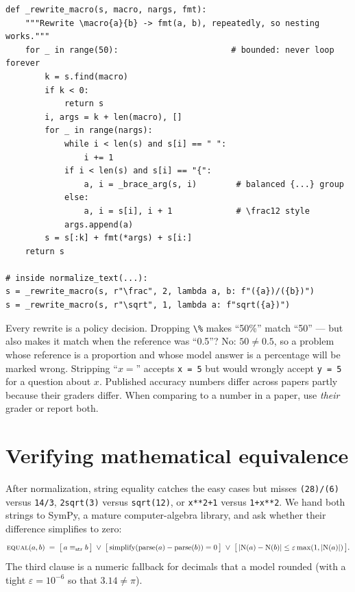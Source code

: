 \begin{lstlisting}[caption={Rewriting macros with brace-delimited arguments (excerpt).},label={lst:eval:rewrite}]
def _rewrite_macro(s, macro, nargs, fmt):
    """Rewrite \macro{a}{b} -> fmt(a, b), repeatedly, so nesting works."""
    for _ in range(50):                       # bounded: never loop forever
        k = s.find(macro)
        if k < 0:
            return s
        i, args = k + len(macro), []
        for _ in range(nargs):
            while i < len(s) and s[i] == " ":
                i += 1
            if i < len(s) and s[i] == "{":
                a, i = _brace_arg(s, i)        # balanced {...} group
            else:
                a, i = s[i], i + 1             # \frac12 style
            args.append(a)
        s = s[:k] + fmt(*args) + s[i:]
    return s

# inside normalize_text(...):
s = _rewrite_macro(s, r"\frac", 2, lambda a, b: f"({a})/({b})")
s = _rewrite_macro(s, r"\sqrt", 1, lambda a: f"sqrt({a})")
\end{lstlisting}

\begin{pitfall}
Every rewrite is a policy decision. Dropping \texttt{\textbackslash\%} makes ``50\%'' match
``50'' --- but also makes it match when the reference was ``0.5''? No: $50 \ne 0.5$, so a
problem whose reference is a proportion and whose model answer is a percentage will be marked
wrong. Stripping ``$x=$'' accepts \texttt{x = 5} but would wrongly accept \texttt{y = 5} for a
question about $x$. Published accuracy numbers differ across papers partly because their graders
differ. When comparing to a number in a paper, use \emph{their} grader or report both.
\end{pitfall}

\section{Verifying mathematical equivalence}\label{sec:eval:sympy}

After normalization, string equality catches the easy cases but misses \texttt{(28)/(6)} versus
\texttt{14/3}, \texttt{2sqrt(3)} versus \texttt{sqrt(12)}, or \texttt{x**2+1} versus
\texttt{1+x**2}. We hand both strings to SymPy, a mature computer-algebra library, and ask
whether their difference simplifies to zero:
\begin{equation}
  \textsc{equal}(a, b) \;=\; \bigl[\, a \equiv_{\text{str}} b \,\bigr] \;\lor\;
  \bigl[\, \mathrm{simplify}(\mathrm{parse}(a) - \mathrm{parse}(b)) = 0 \,\bigr]
  \;\lor\; \bigl[\, |\mathrm{N}(a) - \mathrm{N}(b)| \le \varepsilon \max(1, |\mathrm{N}(a)|) \,\bigr].
  \label{eq:eval:equal}
\end{equation}
The third clause is a numeric fallback for decimals that a model rounded (with a tight
$\varepsilon = 10^{-6}$ so that $3.14 \ne \pi$).

